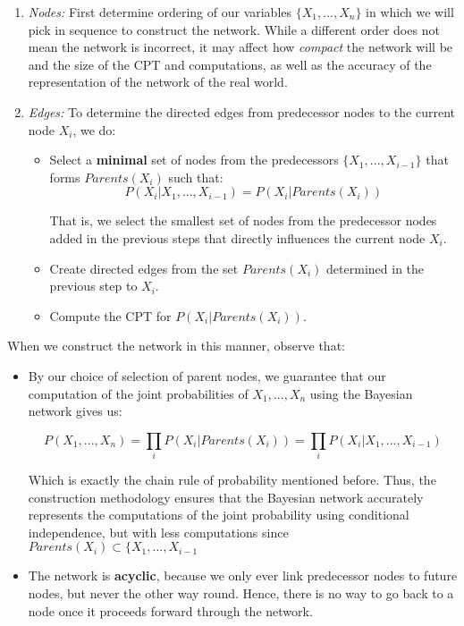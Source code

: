 \documentclass[12pt]{article}
\begin{document}
\begin{enumerate}
\item \textit{Nodes:} First determine ordering of our variables $\{X_1,...,X_n\}$ in which we will pick in sequence to construct the network. While a different order does not mean the network is incorrect, it may affect how \textit{compact} the network will be and the size of the CPT and computations, as well as the accuracy of the representation of the network of the real world.

\item \textit{Edges:} To determine the directed edges from predecessor nodes to the current node $X_i$, we do:
\begin{itemize}
\item Select a \textbf{minimal} set of nodes from the predecessors $\{X_1,..., X_{i-1}\}$ that forms $Parents(X_i)$ such that: 
\begin{equation*}
P(X_i | X_1, ..., X_{i-1}) = P(X_i | Parents(X_i))
\end{equation*}

That is, we select the smallest set of nodes from the predecessor nodes added in the previous steps that directly influences the current node $X_i$.

\item Create directed edges from the set $Parents(X_i)$ determined in the previous step to $X_i$.
\item Compute the CPT for $P(X_i | Parents(X_i))$.
\end{itemize}
\end{enumerate}

When we construct the network in this manner, observe that:

\begin{itemize}
\item By our choice of selection of parent nodes, we guarantee that our computation of the joint probabilities of $X_1,..., X_n$ using the Bayesian network gives us:

\begin{equation*}
P(X_1,..., X_n) =  \prod_i P(X_i | Parents(X_i)) = \prod_{i} P(X_i | X_1, ..., X_{i-1})
\end{equation*}

Which is exactly the chain rule of probability mentioned before. Thus, the construction methodology ensures that the Bayesian network accurately represents the computations of the joint probability using conditional independence, but with less computations since $Parents(X_i) \subset \{X_1,..., X_{i-1}$

\item The network is \textbf{acyclic}, because we only ever link predecessor nodes to future nodes, but never the other way round. Hence, there is no way to go back to a node once it proceeds forward through the network.

\end{itemize}
\end{document}
